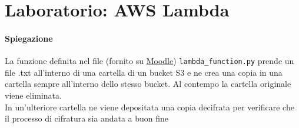 \newpage
\section{Laboratorio: AWS Lambda}

\paragraph{Spiegazione}
La funzione definita nel file (fornito su \href{https://elearning.di.unipi.it/enrol/index.php?id=334}{Moodle}) \verb|lambda_function.py| prende un file .txt all'interno di una cartella di un bucket S3 e ne crea una copia in una cartella  sempre all'interno dello stesso bucket. Al contempo la cartella originale viene eliminata.\\
In un'ulteriore cartella  ne viene depositata una copia decifrata per verificare che il processo di cifratura sia andata a buon fine

